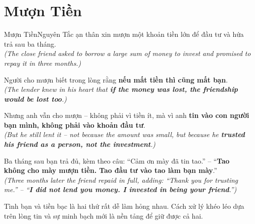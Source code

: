 \section{Mượn Tiền}
\begin{truyen}{Mượn Tiền}{Nguyên Tắc}
ạn thân xin mượn một khoản tiền lớn để đầu tư và hứa trả sau ba tháng.\\
\textit{(The close friend asked to borrow a large sum of money to invest and promised to repay it in three months.)}

Người cho mượn biết trong lòng rằng \textbf{nếu mất tiền thì cũng mất bạn}.\\
\textit{(The lender knew in his heart that \textbf{if the money was lost, the friendship would be lost too}.)}

Nhưng anh vẫn cho mượn – không phải vì tiền ít, mà vì anh \textbf{tin vào con người bạn mình, không phải vào khoản đầu tư}.\\
\textit{(But he still lent it – not because the amount was small, but because he \textbf{trusted his friend as a person, not the investment}.)}

Ba tháng sau bạn trả đủ, kèm theo câu: ``Cảm ơn mày đã tin tao.'' – ``\textbf{Tao không cho mày mượn tiền. Tao đầu tư vào tao làm bạn mày}.''\\
\textit{(Three months later the friend repaid in full, adding: ``Thank you for trusting me.'' – ``\textbf{I did not lend you money. I invested in being your friend}.'')}
\end{truyen}
\begin{baihoc}
  Tình bạn và tiền bạc là hai thứ rất dễ làm hỏng nhau. Cách xử lý khéo léo dựa trên lòng tin và sự minh bạch mới là nền tảng để giữ được cả hai.
\end{baihoc}

